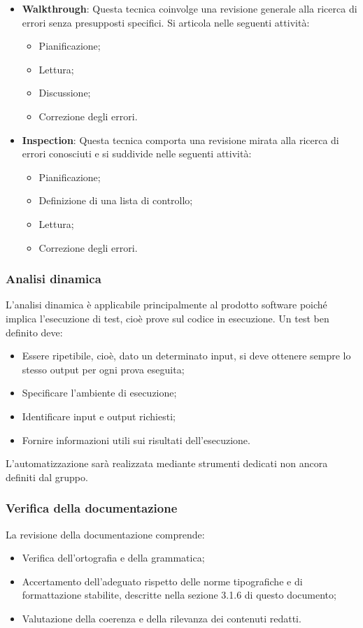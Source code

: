 \begin{itemize}
\item \textbf{Walkthrough}: Questa tecnica coinvolge una revisione generale alla ricerca di errori senza presupposti specifici. Si articola nelle seguenti attività:
\begin{itemize}
\item Pianificazione;
\item Lettura;
\item Discussione;
\item Correzione degli errori.
\end{itemize}
\item \textbf{Inspection}: Questa tecnica comporta una revisione mirata alla ricerca di errori conosciuti e si suddivide nelle seguenti attività:
\begin{itemize}
\item Pianificazione;
\item Definizione di una lista di controllo;
\item Lettura;
\item Correzione degli errori.
\end{itemize}
\end{itemize}
\subsubsection{Analisi dinamica}
L'analisi dinamica è applicabile principalmente al prodotto software
poiché implica l'esecuzione di test, cioè prove sul codice in esecuzione.
Un test ben definito deve:

\begin{itemize}
\item Essere ripetibile, cioè, dato un determinato input, si deve ottenere sempre lo stesso output per ogni prova eseguita;
\item Specificare l'ambiente di esecuzione;
\item Identificare input e output richiesti;
\item Fornire informazioni utili sui risultati dell'esecuzione.
\end{itemize}
L'automatizzazione sarà realizzata mediante strumenti dedicati non ancora definiti dal gruppo.
\subsubsection{Verifica della documentazione}
La revisione della documentazione comprende:

\begin{itemize}
\item Verifica dell'ortografia e della grammatica;
\item Accertamento dell'adeguato rispetto delle norme tipografiche e di formattazione stabilite, descritte nella sezione 3.1.6 di questo documento;
\item Valutazione della coerenza e della rilevanza dei contenuti redatti.
\end{itemize}
